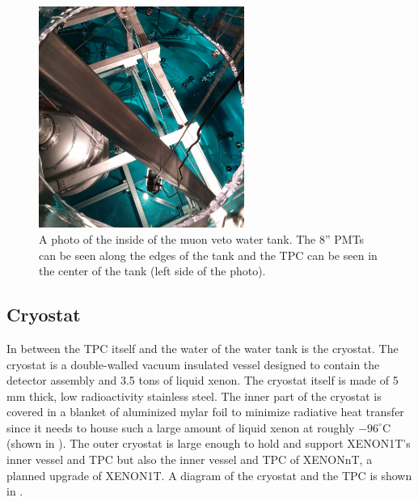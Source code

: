  
 \begin{figure}[t]
	\centering
	\includegraphics[width=0.6\textwidth]{water_tank_filling}
	\caption{A photo of the inside of the muon veto water tank.  The 8'' PMTs can be seen along the edges of the tank and the TPC can be seen in the center of the tank (left side of the photo).}
	\label{fig:photo_water_tank}
\end{figure}



 \subsection{Cryostat}
 \label{sec:cryostat}


In between the TPC itself and the water of the water tank is the cryostat.  The cryostat is a double-walled vacuum insulated vessel designed to contain the detector assembly and 3.5 tons of liquid xenon.  The cryostat itself is made of 5 mm thick, low radioactivity stainless steel.  The inner part of the cryostat is covered in a blanket of aluminized mylar foil to minimize radiative heat transfer since it needs to house such a large amount of liquid xenon at roughly $-96^{\circ}$C (shown in ).  The outer cryostat is large enough to hold and support  XENON1T's inner vessel and TPC but also the inner vessel and TPC of XENONnT, a planned upgrade of XENON1T.  A diagram of the cryostat and the TPC is shown in .

